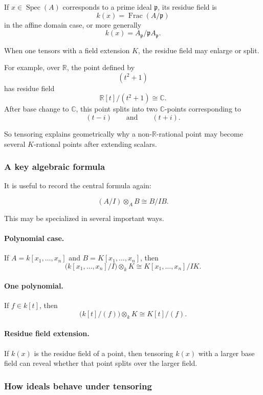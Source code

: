 \documentclass[12pt,a4paper]{article}
\theoremstyle{notespace}
\newcommand{\Spec}{\operatorname{Spec}}
\newcommand{\Frac}{\operatorname{Frac}}
\theoremstyle{definition}
\begin{document}
If \(x\in \Spec(A)\) corresponds to a prime ideal \(\mathfrak p\), its residue field is
\[
k(x)=\Frac(A/\mathfrak p)
\]
in the affine domain case, or more generally
\[
k(x)=A_{\mathfrak p}/\mathfrak p A_{\mathfrak p}.
\]

When one tensors with a field extension \(K\), the residue field may enlarge or split.

For example, over \(\mathbb{R}\), the point defined by
\[
(t^2+1)
\]
has residue field
\[
\mathbb{R}[t]/(t^2+1)\cong \mathbb{C}.
\]
After base change to \(\mathbb{C}\), this point splits into two \(\mathbb{C}\)-points corresponding to
\[
(t-i)
\qquad\text{and}\qquad
(t+i).
\]

So tensoring explains geometrically why a non-\(\mathbb{R}\)-rational point may become several \(K\)-rational points after extending scalars.

\subsubsection{A key algebraic formula}

It is useful to record the central formula again:

\[
(A/I)\otimes_A B \cong B/IB.
\]

This may be specialized in several important ways.

\paragraph{Polynomial case.}
If \(A=k[x_1,\dots,x_n]\) and \(B=K[x_1,\dots,x_n]\), then
\[
\bigl(k[x_1,\dots,x_n]/I\bigr)\otimes_k K
\cong
K[x_1,\dots,x_n]/IK.
\]

\paragraph{One polynomial.}
If \(f\in k[t]\), then
\[
\bigl(k[t]/(f)\bigr)\otimes_k K
\cong
K[t]/(f).
\]

\paragraph{Residue field extension.}
If \(k(x)\) is the residue field of a point, then tensoring \(k(x)\) with a larger base field can reveal whether that point splits over the larger field.

\subsubsection{How ideals behave under tensoring}
\end{document}
